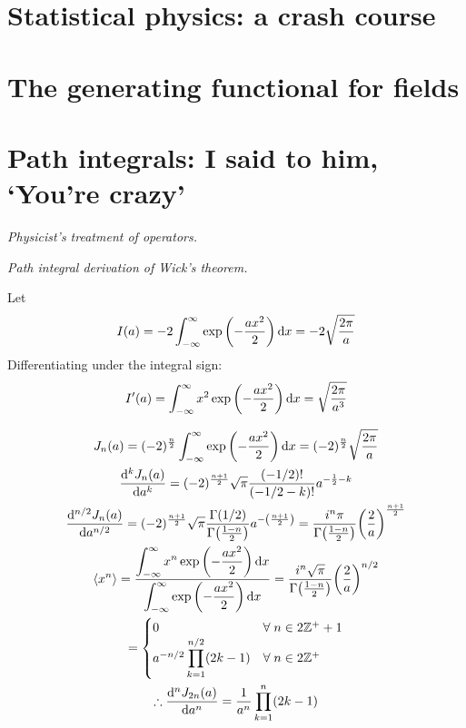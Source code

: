 \documentclass{report}
\begin{document}
\chapter{Statistical physics: a crash course}

\chapter{The generating functional for fields}

\chapter{Path integrals: I said to him, `You're crazy'}

\begin{subquests}
	\item \emph{Physicist's treatment of operators.}

	\item \emph{Path integral derivation of Wick's theorem.}
	\begin{subquests}
		\item Let
		\begin{gather*}
			I(a) = -2\int_{-\infty}^{\infty}\exp\pqty{-\frac{ax^2}{2}} \dd{x} = -2\sqrt{\frac{2\pi}{a}}
		\end{gather*}
		Differentiating under the integral sign:
		\begin{gather*}
			I'(a) = \int_{-\infty}^{\infty}x^2\exp\pqty{-\frac{ax^2}{2}} \dd{x} = \sqrt{\frac{2\pi}{a^3}}
		\end{gather*}

		\item 
		\begin{gather*}
			J_n(a) = (-2)^\frac{n}{2} \int_{-\infty}^{\infty}\exp\pqty{-\frac{ax^2}{2}} \dd{x} = (-2)^{\frac{n}{2}}\sqrt{\frac{2\pi}{a}} \\
			\dv[k]{J_n(a)}{a} = (-2)^{\frac{n+1}{2}}\sqrt{\pi}\frac{(-1/2)!}{(-1/2-k)!}a^{-\frac{1}{2}-k} \\
			\dv[n/2]{J_n(a)}{a} = (-2)^{\frac{n+1}{2}}\sqrt{\pi}\frac{\Gamma(1/2)}{\Gamma\pqty{\frac{1-n}{2}}} a^{-\pqty{\frac{n+1}{2}}} = \frac{i^n \pi}{\Gamma\pqty{\frac{1-n}{2}}}\pqty{\frac{2}{a}}^{\frac{n+1}{2}} \\
			\expval{x^n} = \frac{\displaystyle\int_{-\infty}^{\infty}x^n\exp\pqty{-\frac{ax^2}{2}} \dd{x}}{\displaystyle\int_{-\infty}^{\infty}\exp\pqty{-\frac{ax^2}{2}} \dd{x}} = \frac{i^n \sqrt{\pi}}{\Gamma\pqty{\frac{1-n}{2}}}\pqty{\frac{2}{a}}^{n/2} \\
			= \begin{cases} 0 & \forall\;n \in 2\mathbb{Z^+} + 1 \\ a^{-n/2}\displaystyle\prod_{k = 1}^{n/2}(2k-1) & \forall\;n \in 2\mathbb{Z^+} \end{cases} \\
			\therefore \dv[n]{J_{2n}(a)}{a} = \frac{1}{a^n}\prod_{k=1}^{n}(2k-1)
		\end{gather*}
	\end{subquests}
\end{subquests}
\end{document}
